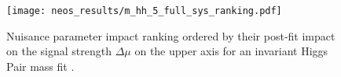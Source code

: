 \begin{figure}
    \centering
    \texttt{[image: neos\_results/m\_hh\_5\_full\_sys\_ranking.pdf]}
    \caption[]{Nuisance parameter impact ranking ordered by their post-fit impact on the signal strength $\Delta\mu$ on the upper axis for an invariant Higgs Pair mass fit \mhh{}. }
    \label{fig:m_hh_full_sys_ranking}
\end{figure}